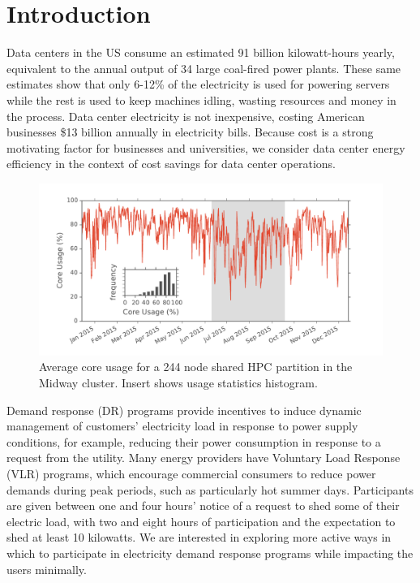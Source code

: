 

\section{Introduction}

Data centers in the US consume an estimated 91 billion kilowatt-hours yearly, equivalent to the annual output of 34 large coal-fired power plants.\cite{Delforge2014} These same estimates show that only 6-12\% of the electricity is used for powering servers while the rest is used to keep machines idling, wasting resources and money in the process. Data center electricity is not inexpensive, costing American businesses \$13 billion annually in electricity bills.\cite{Delforge2014} Because cost is a strong motivating factor for businesses and universities, we consider data center energy efficiency in the context of cost savings for data center operations. \\

\begin{figure}[t]
	\begin{center}
		\includegraphics[scale=0.38]{edeals/pwr_model_ins}
	\end{center}
	\caption{Average core usage for a 244 node shared HPC partition in the Midway cluster. Insert shows usage statistics histogram.}
	\label{prw_model_ins}
\end{figure}

Demand response (DR) programs provide incentives to induce dynamic management of customers’ electricity load in response to power supply conditions, for example, reducing their power consumption in response to a request from the utility.\cite{7039172} Many energy providers have Voluntary Load Response (VLR) programs, which encourage commercial consumers to reduce power demands during peak periods, such as particularly hot summer days. Participants are given between one and four hours’ notice of a request to shed some of their electric load, with two and eight hours of participation and the expectation to shed at least 10 kilowatts. We are interested in exploring more active ways in which to participate in electricity demand response programs while impacting the users minimally.   \\


